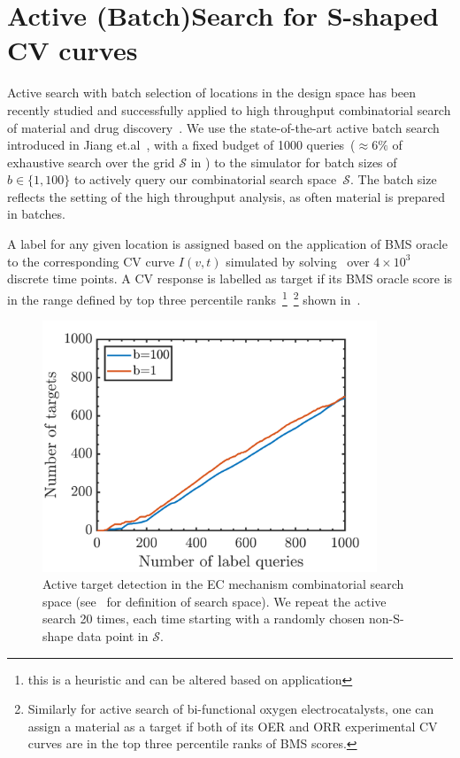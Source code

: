 \section{Active (Batch)Search for S-shaped CV curves}
Active search with batch selection of locations in the design space has been recently studied and successfully applied to  high throughput combinatorial search of material and drug discovery~\cite{jiang2018efficient}. 
We use the state-of-the-art active batch search introduced in Jiang et.al~\cite{jiang2018efficient}, with a fixed budget of 1000 queries~(\(\approx6\%\) of exhaustive search over the grid \(\mathcal{S}\) in ) to the simulator for batch sizes of \(b\in\{1,100\}\) to actively query our combinatorial search space~\(\mathcal{S}\).
The batch size reflects the setting of the high throughput analysis, as often material is prepared in batches.

A label for any given location is assigned based on the application of BMS oracle to the corresponding CV curve \(I(v,t)\) simulated by solving~ over \(4\times10^3\) discrete time points. 
A CV response is labelled as target if its BMS oracle score is in the range defined by top three percentile ranks~\footnote{this is a heuristic and can be altered based on application}~\footnote{Similarly for active search of bi-functional oxygen electrocatalysts, one can assign a material as a target if both of its OER and ORR experimental CV curves are in the top three percentile ranks of BMS scores. } shown in~. 

\begin{figure}[h]
    \centering
    \includegraphics[width=100mm]{Chapter-3/figures/batch_results.png}
    \caption{Active target detection in the EC mechanism combinatorial search space (see~ for definition of search space). We repeat the active search 20 times, each time starting with a randomly chosen non-S-shape data point in \(\mathcal{S}\). }
    \label{fig:batchens_fullec}
\end{figure}

